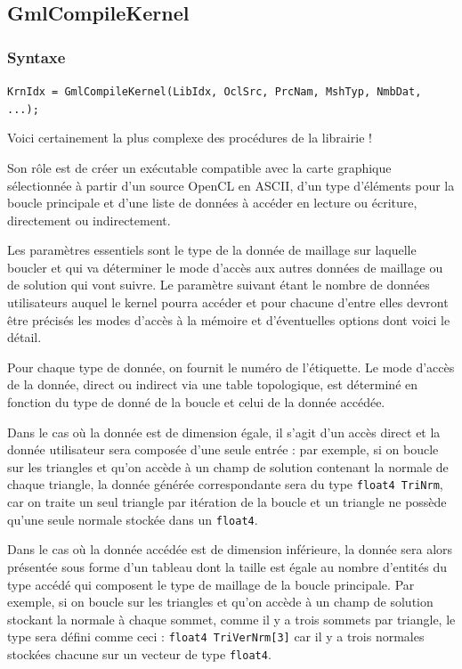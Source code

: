 \documentclass[a4paper,12pt]{article}
\begin{document}
\subsection{GmlCompileKernel}

\subsubsection*{Syntaxe}

{\tt KrnIdx = GmlCompileKernel(LibIdx, OclSrc, PrcNam, MshTyp, NmbDat, ...);}

Voici certainement la plus complexe des procédures de la librairie !

Son rôle est de créer un exécutable compatible avec la carte graphique sélectionnée à partir d'un source OpenCL en ASCII, d'un type d’éléments pour la boucle principale et d'une liste de données à accéder en lecture ou écriture, directement ou indirectement.

Les paramètres essentiels sont le type de la donnée de maillage sur laquelle boucler et qui va déterminer le mode d'accès aux autres données de maillage ou de solution qui vont suivre.
Le paramètre suivant étant le nombre de données utilisateurs auquel le kernel pourra accéder et pour chacune d'entre elles devront être précisés les modes d'accès à la mémoire et d'éventuelles options dont voici le détail.

Pour chaque type de donnée, on fournit le numéro de l'étiquette.
Le mode d'accès de la donnée, direct ou indirect via une table topologique, est déterminé en fonction du type de donné de la boucle et celui de la donnée accédée.

Dans le cas où la donnée est de dimension égale, il s'agit d'un accès direct et la donnée utilisateur sera composée d'une seule entrée : par exemple, si on boucle sur les triangles et qu'on accède à un champ de solution contenant la normale de chaque triangle, la donnée générée correspondante sera du type {\tt float4 TriNrm}, car on traite un seul triangle par itération de la boucle et un triangle ne possède qu'une seule normale stockée dans un {\tt float4}.

Dans le cas où la donnée accédée est de dimension inférieure, la donnée sera alors présentée sous forme d'un tableau dont la taille est égale au nombre d'entités du type accédé qui composent le type de maillage de la boucle principale. Par exemple, si on boucle sur les triangles et qu'on accède à un champ de solution stockant la normale à chaque sommet, comme il y a trois sommets par triangle, le type sera défini comme ceci : {\tt float4 TriVerNrm[3]} car il y a trois normales stockées chacune sur un vecteur de type {\tt float4}.
\end{document}

